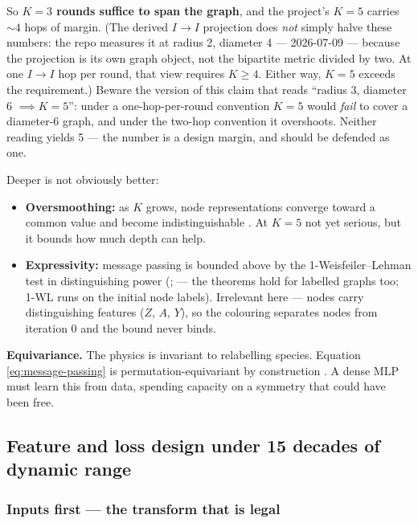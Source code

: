 So \textbf{$K = 3$ rounds suffice to span the graph}, and the project's $K = 5$
carries ${\sim}4$ hops of margin. (The derived $I\to I$ projection does
\emph{not} simply halve these numbers: the repo measures it at radius 2,
diameter 4 ---  2026-07-09 --- because the projection is its
own graph object, not the bipartite metric divided by two. At one $I\to I$ hop
per round, that view requires $K \geq 4$. Either way, $K = 5$ exceeds the
requirement.) Beware the version of this claim that reads ``radius 3, diameter 6
$\implies K = 5$'': under a one-hop-per-round convention $K = 5$ would
\emph{fail} to cover a diameter-6 graph, and under the two-hop convention it
overshoots. Neither reading yields 5 --- the number is a design margin, and
should be defended as one.

Deeper is not obviously better:

\begin{itemize}
\item \textbf{Oversmoothing:} as $K$ grows, node representations converge toward
      a common value and become indistinguishable \citep{li2018}. At $K = 5$ not
      yet serious, but it bounds how much depth can help.
\item \textbf{Expressivity:} message passing is bounded above by the
      1-Weisfeiler--Lehman test in distinguishing power
      (\citealt{xu2019}; \citealt{morris2019} --- the theorems hold for labelled
      graphs too; 1-WL runs on the initial node labels). Irrelevant here ---
      nodes carry distinguishing features ($Z$, $A$, $Y$), so the colouring
      separates nodes from iteration 0 and the bound never binds.
\end{itemize}

\textbf{Equivariance.} The physics is invariant to relabelling species.
Equation \eqref{eq:message-passing} is permutation-equivariant by construction
\citep{battaglia2018,bronstein2021}. A dense MLP must learn this from data,
spending capacity on a symmetry that could have been free.

\subsection{Feature and loss design under 15 decades of dynamic range}
\label{sec:featureloss}

\subsubsection{Inputs first --- the transform that is legal}
\label{sec:inputtransform}

